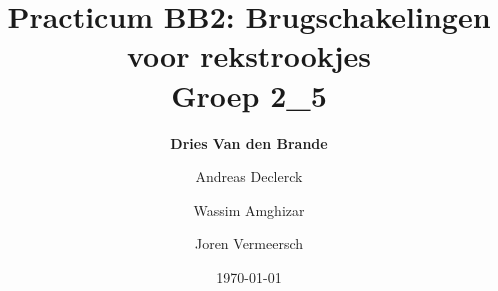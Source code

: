\documentclass[12pt]{article}
\begin{document}
    \title{\textbf{Practicum BB2: Brugschakelingen voor rekstrookjes} \\\small{Groep 2\_5}}
    \author{\textbf{Dries Van den Brande} \and Andreas Declerck \and Wassim Amghizar \and Joren Vermeersch}
    \date{\today}

    \maketitle


    

    

    

    

    

    
\end{document}
